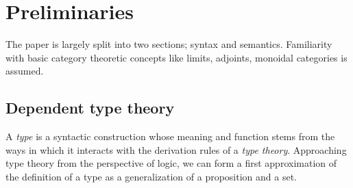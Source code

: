 \section{Preliminaries}
The paper is largely split into two sections; syntax and semantics. 
Familiarity with basic category theoretic concepts like limits, adjoints, monoidal categories is assumed.
\subsection{Dependent type theory}
A \textit{type} is a syntactic construction whose meaning and function stems from the ways in which it interacts with the derivation rules of a \textit{type theory}. Approaching type theory from the perspective of logic, we can form a first approximation of the definition of a type as a generalization of a proposition and a set.
